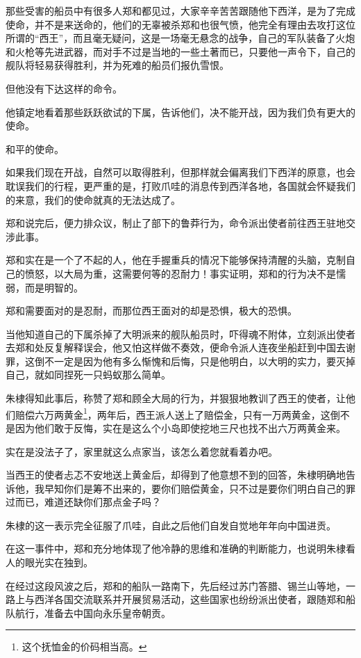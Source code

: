 \begin{multicols}{\theparacolNo}
那些受害的船员中有很多人郑和都见过，大家辛辛苦苦跟随他下西洋，是为了完成使命，并不是来送命的，他们的无辜被杀郑和也很气愤，他完全有理由去攻打这位所谓的“西王”，而且毫无疑问，这是一场毫无悬念的战争，自己的军队装备了火炮和火枪等先进武器，而对手不过是当地的一些土著而已，只要他一声令下，自己的舰队将轻易获得胜利，并为死难的船员们报仇雪恨。

但他没有下达这样的命令。

他镇定地看着那些跃跃欲试的下属，告诉他们，决不能开战，因为我们负有更大的使命。

和平的使命。

如果我们现在开战，自然可以取得胜利，但那样就会偏离我们下西洋的原意，也会耽误我们的行程，更严重的是，打败爪哇的消息传到西洋各地，各国就会怀疑我们的来意，我们的使命就真的无法达成了。

郑和说完后，便力排众议，制止了部下的鲁莽行为，命令派出使者前往西王驻地交涉此事。

郑和实在是一个了不起的人，他在手握重兵的情况下能够保持清醒的头脑，克制自己的愤怒，以大局为重，这需要何等的忍耐力！事实证明，郑和的行为决不是懦弱，而是明智的。

郑和需要面对的是忍耐，而那位西王面对的却是恐惧，极大的恐惧。

当他知道自己的下属杀掉了大明派来的舰队船员时，吓得魂不附体，立刻派出使者去郑和处反复解释误会，他又怕这样做不奏效，便命令派人连夜坐船赶到中国去谢罪，这倒不一定是因为他有多么惭愧和后悔，只是他明白，以大明的实力，要灭掉自己，就如同捏死一只蚂蚁那么简单。

朱棣得知此事后，称赞了郑和顾全大局的行为，并狠狠地教训了西王的使者，让他们赔偿六万两黄金\footnote{这个抚恤金的价码相当高。}，两年后，西王派人送上了赔偿金，只有一万两黄金，这倒不是因为他们敢于反悔，实在是这么个小岛即使挖地三尺也找不出六万两黄金来。

实在是没法子了，家里就这么点家当，该怎么着您就看着办吧。

当西王的使者忐忑不安地送上黄金后，却得到了他意想不到的回答，朱棣明确地告诉他，我早知你们是筹不出来的，要你们赔偿黄金，只不过是要你们明白自己的罪过而已，难道还缺你们那点金子吗？

朱棣的这一表示完全征服了爪哇，自此之后他们自发自觉地年年向中国进贡。

在这一事件中，郑和充分地体现了他冷静的思维和准确的判断能力，也说明朱棣看人的眼光实在独到。

在经过这段风波之后，郑和的船队一路南下，先后经过苏门答腊、锡兰山等地，一路上与西洋各国交流联系并开展贸易活动，这些国家也纷纷派出使者，跟随郑和船队航行，准备去中国向永乐皇帝朝贡。


\end{multicols}
